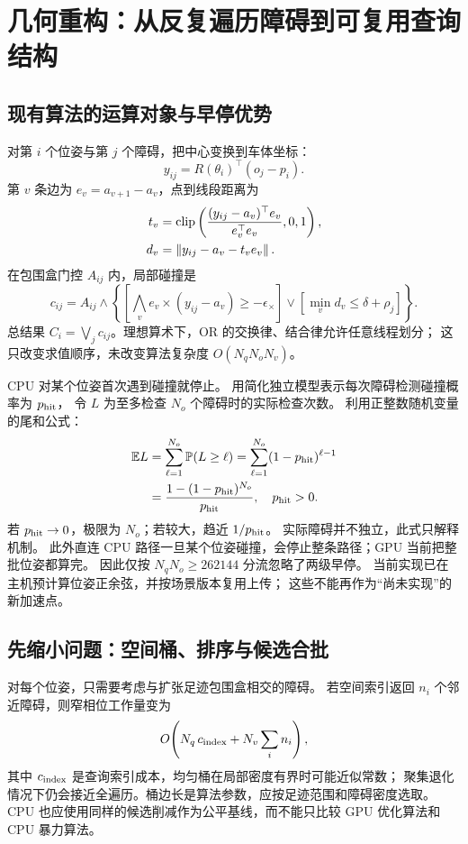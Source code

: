 \section{几何重构：从反复遍历障碍到可复用查询结构}
\subsection{现有算法的运算对象与早停优势}
对第 $i$ 个位姿与第 $j$ 个障碍，把中心变换到车体坐标：
\[
y_{ij}=R(\theta_i)^\top(o_j-p_i).
\]
第 $v$ 条边为 $e_v=a_{v+1}-a_v$，点到线段距离为
\begin{align}
t_v&=\operatorname{clip}\left(\frac{(y_{ij}-a_v)^\top e_v}{e_v^\top e_v},0,1\right),\\
d_v&=\left\lVert y_{ij}-a_v-t_ve_v\right\rVert.
\end{align}
在包围盒门控 $A_{ij}$ 内，局部碰撞是
\[
c_{ij}=A_{ij}\land
\left\{\left[\bigwedge_v e_v\times(y_{ij}-a_v)\ge-\epsilon_\times\right]
\lor\left[\min_v d_v\le\delta+\rho_j\right]\right\}.
\]
总结果 $C_i=\bigvee_jc_{ij}$。理想算术下，OR 的交换律、结合律允许任意线程划分；
这只改变求值顺序，未改变算法复杂度 $O(N_qN_oN_v)$。

CPU 对某个位姿首次遇到碰撞就停止。
用简化独立模型表示每次障碍检测碰撞概率为 $p_{\rm hit}$，
令 $L$ 为至多检查 $N_o$ 个障碍时的实际检查次数。
利用正整数随机变量的尾和公式：
\begin{align}
\mathbb E L&=\sum_{\ell=1}^{N_o}\mathbb P(L\ge\ell)
=\sum_{\ell=1}^{N_o}(1-p_{\rm hit})^{\ell-1}\\
&=\frac{1-(1-p_{\rm hit})^{N_o}}{p_{\rm hit}},\quad p_{\rm hit}>0.
\label{eq:early}
\end{align}
若 $p_{\rm hit}\to0$，极限为 $N_o$；若较大，趋近 $1/p_{\rm hit}$。
实际障碍并不独立，此式只解释机制。
此外直连 CPU 路径一旦某个位姿碰撞，会停止整条路径；GPU 当前把整批位姿都算完。
因此仅按 $N_qN_o\ge262144$ 分流忽略了两级早停。
当前实现已在主机预计算位姿正余弦，并按场景版本复用上传；
这些不能再作为“尚未实现”的新加速点。

\subsection{先缩小问题：空间桶、排序与候选合批}
对每个位姿，只需要考虑与扩张足迹包围盒相交的障碍。
若空间索引返回 $n_i$ 个邻近障碍，则窄相位工作量变为
\[
O\!\left(N_q\,c_{\rm index}+N_v\sum_i n_i\right),
\]
其中 $c_{\rm index}$ 是查询索引成本，均匀桶在局部密度有界时可能近似常数；
聚集退化情况下仍会接近全遍历。桶边长是算法参数，应按足迹范围和障碍密度选取。
CPU 也应使用同样的候选削减作为公平基线，而不能只比较 GPU 优化算法和 CPU 暴力算法。

